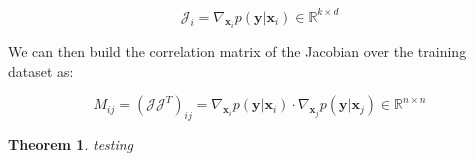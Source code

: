 \documentclass{article}
\newtheorem{theorem}{Theorem}
\newcommand{\R}{\mathbb{R}}
\newcommand{\matr}[1]{\mathbf{#1}}
\begin{document}
\begin{equation}
\mathcal{J}_i = \nabla_{\matr{x}_i} p(\matr{y} | \matr{x}_i) \in \R^{k \times d}
\end{equation}

We can then build the correlation matrix of the Jacobian over the training dataset as:

\begin{equation}
M_{ij} = (\mathcal{J} \mathcal{J}^T)_{ij} = \nabla_{\matr{x}_i} p(\matr{y}|\matr{x}_i) \cdot \nabla_{\matr{x}_j} p(\matr{y}|\matr{x}_j) \in \R^{n \times n} 
\end{equation}

\begin{theorem}
testing
\end{theorem}




\end{document}
